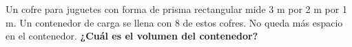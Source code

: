 Un cofre para juguetes con forma de prisma rectangular mide 3 m por 2 m por 1 m.
Un contenedor de carga se llena con 8 de estos cofres. No queda más espacio en el contenedor.
\textbf{¿Cuál es el volumen del contenedor?}
\fillin[48][1cm]